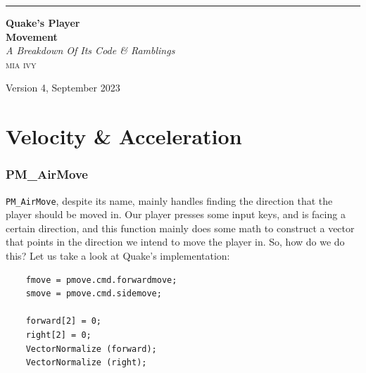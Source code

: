 \documentclass{article}
\begin{document}
\begin{titlepage} %
	
	\raggedleft %
	
	\rule{1pt}{\textheight} %
	\hspace{0.05\textwidth} %
	\parbox[b]{0.75\textwidth}{ %
		
		{\Huge\bfseries Quake's Player \\[0.5\baselineskip] Movement}\\[2\baselineskip]
		{\large\textit{A Breakdown Of Its Code \& Ramblings}}\\[4\baselineskip]
		{\Large\textsc{mia ivy}}
		
		\vspace{0.5\textheight}
        {\noindent Version 4, September 2023}\\[\baselineskip]
		
		}

\end{titlepage}
\tableofcontents
\newpage
\part{Velocity \& Acceleration}
\section{PM\_AirMove}
\texttt{PM\_AirMove}, despite its name, mainly handles finding the direction that the player should be moved in. Our player presses some input keys, and is facing a certain direction, and this function mainly
does some math to construct a vector that points in the direction we intend to move the player in. So, how do we do this? Let us take a look at Quake’s implementation:
\begin{verbatim}
	fmove = pmove.cmd.forwardmove;
	smove = pmove.cmd.sidemove;
	
	forward[2] = 0;
	right[2] = 0;
	VectorNormalize (forward);
	VectorNormalize (right);
\end{verbatim}
    
\end{document}
